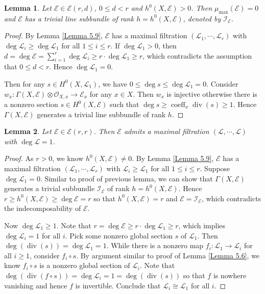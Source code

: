 \documentclass{ctexart}
\newtheorem{lemma}{Lemma}[section]
\newcommand{\divisor}{\operatorname{div}}
\newcommand{\coefficient}{\operatorname{coeff}}
\begin{document}
\begin{lemma}
    Let $\mathcal{E}\in \mathcal{E}(r, d)$, $0 \le d < r$ and $h^{0}(X, \mathcal{E}) > 0$.
    Then $\mu_{\max}(\mathcal{E}) = 0$ and $\mathcal{E}$ has a trivial line subbundle of rank $h = h^{0}(X, \mathcal{E})$, denoted by $\mathcal{I}_{\mathcal{E}}$.
    \label{Lemma 5.10}
\end{lemma}
\begin{proof}
    By Lemma \ref{Lemma 5.9}, $\mathcal{E}$ has a maximal filtration $(\mathcal{L}_{1}, \cdots, \mathcal{L}_{r})$ with $\deg \mathcal{L}_{i} \ge \deg \mathcal{L}_{1}$ for all $1 \le i \le r$.
    If $\deg \mathcal{L}_{1} > 0$, then $d = \deg \mathcal{E} = \sum_{i = 1}^{r} \deg \mathcal{L}_{i} \ge r \cdot \deg \mathcal{L}_{1} \ge r$, which contradicts the assumption that $0 \le d < r$.
    Hence $\deg \mathcal{L}_{1} = 0$.
    \par
    Then for any $s\in H^{0}(X, \mathcal{L}_{1})$, we have $0 \le \deg s \le \deg \mathcal{L}_{1} = 0$.
    Consider $w_{x}: \Gamma(X, \mathcal{E}) \otimes \mathcal{O}_{X, x} \to \mathcal{E}_{x}$ for any $x \in X$.
    Then $w_{x}$ is injective otherwise there is a nonzero section $s\in H^{0}(X, \mathcal{E})$ such that $\deg s \ge \coefficient_{x} \divisor (s) \ge 1$.
    Hence $\Gamma(X, \mathcal{E})$ generates a trivial line subbundle of rank $h$.
\end{proof}
\begin{lemma}
    Let $\mathcal{E}\in \mathcal{E}(r, r)$.
    Then $\mathcal{E}$ admits a maximal filtration $(\mathcal{L}, \cdots, \mathcal{L})$ with $\deg \mathcal{L} = 1$.
    \vspace{-\baselineskip} %
    \label{Lemma 5.11}
\end{lemma}
\begin{proof}
    As $r > 0$, we know $h^{0}(X, \mathcal{E}) \neq 0$.
    By Lemma \ref{Lemma 5.9}, $\mathcal{E}$ has a maximal filtration $(\mathcal{L}_{1}, \cdots, \mathcal{L}_{r})$ with $\mathcal{L}_{i} \ge \mathcal{L}_{1}$ for all $1 \le i \le r$.
    Suppose $\deg \mathcal{L}_{1} = 0$.
    Similar to proof of previous lemma, we can show that $\Gamma(X, \mathcal{E})$ generates a trivial subbundle $\mathcal{I}_{\mathcal{E}}$ of rank $h = h^{0}(X, \mathcal{E})$.
    Hence $r \ge h^{0}(X, \mathcal{E}) \ge \deg \mathcal{E} = r$ so that $h^{0}(X, \mathcal{E}) = r$ and $\mathcal{E} = \mathcal{I}_{\mathcal{E}}$,
    which contradicts the indecomposability of $\mathcal{E}$.
    \par
    Now $\deg \mathcal{L}_{1} \ge 1$.
    Note that $r = \deg \mathcal{E} \ge r \cdot \deg \mathcal{L}_{1} \ge r$, which implies $\deg \mathcal{L}_{i} = 1$ for all $i$.
    Pick some nonzero global section $s$ of $\mathcal{L}_{1}$.
    Then $\deg (\divisor (s)) = \deg \mathcal{L}_{1} = 1$.
    While there is a nonzero map $f_{i}: \mathcal{L}_{1} \rightarrow \mathcal{L}_{i}$ for all $i \ge 1$, consider $f_{i} \circ s$.
    By argument similar to proof of Lemma \ref{Lemma 5.6}, we know $f_{i} \circ s$ is a nonzero global section of $\mathcal{L}_{i}$.
    Note that $\deg (\divisor (f \circ s)) = \deg \mathcal{L}_{i} = 1 = \deg (\divisor (s))$ so that $f$ is nowhere vanishing and hence $f$ is invertible.
    Conclude that $\mathcal{L}_{i} \cong \mathcal{L}_{1}$ for all $i$.
\end{proof}
\end{document}
